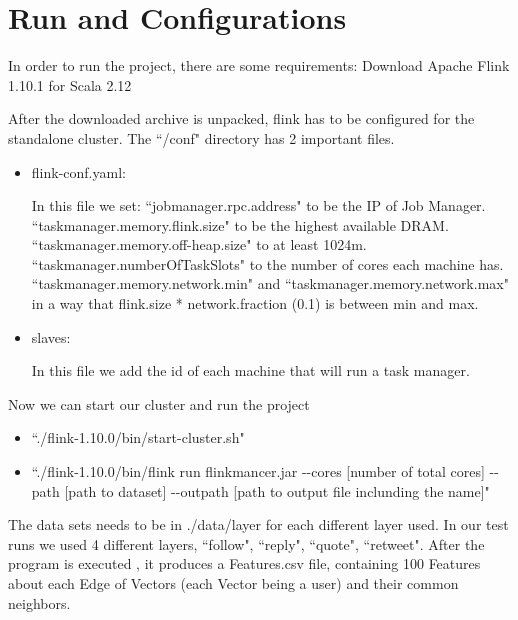 \chapter{Run and Configurations}

In order to run the project, there are some requirements:
Download Apache Flink 1.10.1 for Scala 2.12

After the downloaded archive is unpacked, flink has to be configured for the standalone cluster. The ``/conf" directory has 2 important files.
\begin{itemize}
\item flink-conf.yaml:

In this file we set: 
\newline ``jobmanager.rpc.address"  to be the IP of Job Manager. 
\newline ``taskmanager.memory.flink.size" to be the highest available DRAM. 
\newline ``taskmanager.memory.off-heap.size" to at least 1024m. 
\newline ``taskmanager.numberOfTaskSlots" to the number of cores each machine has. 
\newline ``taskmanager.memory.network.min" and ``taskmanager.memory.network.max" 
\newline in a way that flink.size * network.fraction (0.1) is between min and max.

\item slaves:

In this file we add the id of each machine that will run a task manager. 
\end{itemize}
Now we can start our cluster and run the project
\begin{itemize}
\item  “./flink-1.10.0/bin/start-cluster.sh" 
\item  “./flink-1.10.0/bin/flink run flinkmancer.jar -{}-cores [number of total cores] -{}-path [path to dataset] -{}-outpath [path to output file inclunding the name]" 
\end{itemize}

The data sets needs to be in ./data/{layer} for each different layer used. \newline 
In our test runs we used 4 different layers, ``follow", ``reply", ``quote", ``retweet".
After the program is executed , it produces a Features.csv file, containing 100 Features about each Edge of Vectors (each Vector being a user) and their common neighbors. 
